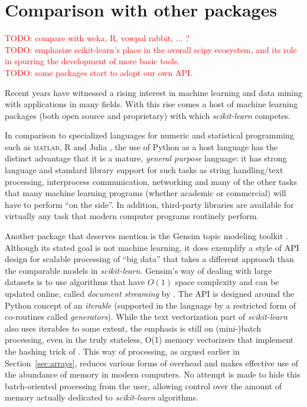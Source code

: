 \documentclass{llncs}
\newcommand{\sklearn}{\textit{scikit-learn}\xspace}
\begin{document}
\section{Comparison with other packages}

\label{sec:comparison}

\textcolor{red}{TODO: compare with weka, R, vowpal rabbit, ... ?}\\
\textcolor{red}{TODO: emphasize scikit-learn's place in the overall scipy ecosystem, and its role in spurring the development of more basic tools.}\\
\textcolor{red}{TODO: some packages start to adopt our own API.}

Recent years have witnessed a rising interest in machine learning and data mining
with applications in many fields.
With this rise comes a host of machine learning packages
(both open source and proprietary) with which \sklearn competes.

In comparison to specialized languages for numeric and statistical programming
such as \textsc{matlab}, R \citep{trancon2012r} and Julia \citep{bezanson2012julia},
the use of Python as a host language has the distinct advantage
that it is a mature, \textit{general purpose} language:
it has strong language and standard library support for such tasks as
string handling/text processing, interprocess communication, networking
and many of the other tasks that many machine learning programs
(whether academic or commercial)
will have to perform ``on the side''.
In addition, third-party libraries are available for virtually any task
that modern computer programs routinely perform.

Another package that deserves mention is the Gensim topic modeling toolkit
\citep{rehurek2010gensim}.
Although its stated goal is not machine learning,
it does exemplify a style of API design for scalable processing of ``big data''
that takes a different approach than the comparable models in \sklearn.
Gensim's way of dealing with large datasets is to use algorithms
that have $O(1)$ space complexity and can be updated online,
called \textit{document streaming} by \citeauthor{rehurek2010gensim}.
The API is designed around the Python concept of an \textit{iterable}
(supported in the language by a restricted form of co-routines called
\textit{generators}).
While the text vectorization part of \sklearn
also uses iterables to some extent,
the emphasis is still on (mini-)batch processing,
even in the truly stateless, O(1) memory vectorizers
that implement the hashing trick of \citet{weinberger2009}.
This way of processing, as argued earlier in Section~\ref{sec:arrays},
reduces various forms of overhead
and makes effective use of the abundance of memory in modern computers.
No attempt is made to hide this batch-oriented processing from the user,
allowing control over the amount of memory actually dedicated
to \sklearn algorithms.
\end{document}
